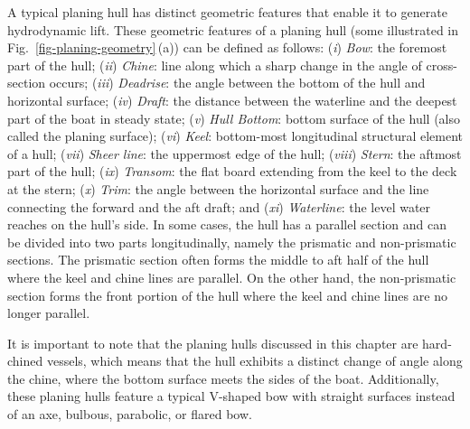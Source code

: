A typical planing hull has distinct geometric features that enable it to generate hydrodynamic lift. These geometric features of a planing hull (some illustrated in Fig.~\ref{fig-planing-geometry}\,(a)) can be defined as follows: \mbox{(\textit{i}\hspace{.5pt})} \textit{Bow}: the foremost part of the hull; \mbox{(\textit{ii}\hspace{.5pt})} \textit{Chine}: line along which a sharp change in the angle of cross-section occurs; \mbox{(\textit{iii}\hspace{.5pt})} \textit{Deadrise}: the angle between the bottom of the hull and horizontal surface; \mbox{(\textit{iv}\hspace{.5pt})} \textit{Draft}: the distance between the waterline and the deepest part of the boat in steady state; \mbox{(\textit{v}\hspace{.5pt})} \textit{Hull Bottom}: bottom surface of the hull (also called the planing surface); \mbox{(\textit{vi}\hspace{.5pt})} \textit{Keel}: bottom-most longitudinal structural element of a hull; \mbox{(\textit{vii}\hspace{.5pt})} \textit{Sheer line}: the uppermost edge of the hull; \mbox{(\textit{viii}\hspace{.5pt})} \textit{Stern}: the aftmost part of the hull; \mbox{(\textit{ix}\hspace{.5pt})} \textit{Transom}: the flat board extending from the keel to the deck at the stern; \mbox{(\textit{x}\hspace{.5pt})} \textit{Trim}: the angle between the horizontal surface and the line connecting the forward and the aft draft; and \mbox{(\textit{xi}\hspace{.5pt})} \textit{Waterline}: the level water reaches on the hull's side. In some cases, the hull has a parallel section and can be divided into two parts longitudinally, namely the prismatic and non-prismatic sections. The prismatic section often forms the middle to aft half of the hull where the keel and chine lines are parallel. On the other hand, the non-prismatic section forms the front portion of the hull where the keel and chine lines are no longer parallel.

It is important to note that the planing hulls discussed in this chapter are hard-chined vessels, which means that the hull exhibits a distinct change of angle along the chine, where the bottom surface meets the sides of the boat. Additionally, these planing hulls feature a typical V-shaped bow with straight surfaces instead of an axe, bulbous, parabolic, or flared bow.

